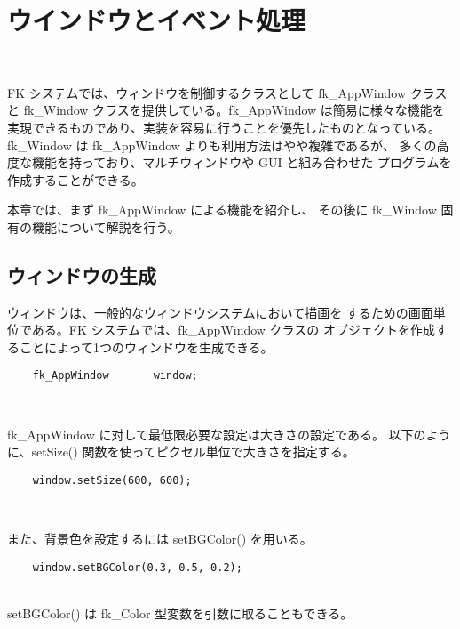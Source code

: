 \chapter{ウインドウとイベント処理} \label{sec:window} ~

FK システムでは、ウィンドウを制御するクラスとして fk\_AppWindow クラスと
fk\_Window クラスを提供している。fk\_AppWindow は簡易に様々な機能を
実現できるものであり、実装を容易に行うことを優先したものとなっている。
fk\_Window は fk\_AppWindow よりも利用方法はやや複雑であるが、
多くの高度な機能を持っており、マルチウィンドウや GUI と組み合わせた
プログラムを作成することができる。

本章では、まず fk\_AppWindow による機能を紹介し、
その後に fk\_Window 固有の機能について解説を行う。


\section{ウィンドウの生成}
ウィンドウは、一般的なウィンドウシステムにおいて描画を
するための画面単位である。FK システムでは、fk\_AppWindow クラスの
オブジェクトを作成することによって1つのウィンドウを生成できる。
\\
\begin{screen}
\begin{verbatim}
    fk_AppWindow       window;
\end{verbatim}
\end{screen}
~

fk\_AppWindow に対して最低限必要な設定は大きさの設定である。
以下のように、setSize() 関数を使ってピクセル単位で大きさを指定する。
\\
\begin{screen}
\begin{verbatim}
    window.setSize(600, 600);
\end{verbatim}
\end{screen}
~

また、背景色を設定するには setBGColor() を用いる。
\\
\begin{screen}
\begin{verbatim}
    window.setBGColor(0.3, 0.5, 0.2);
\end{verbatim}
\end{screen}
~ \\
setBGColor() は fk\_Color 型変数を引数に取ることもできる。


